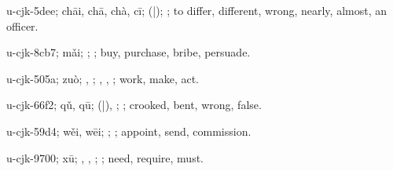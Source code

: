 \begin{multicols}{2}
{\cjkgGlue{}u-cjk-5dee; chāi, chā, chà, cī; \cjkgGlue{}\cjkgGlue{}(\cjkgGlue{}|\cjkgGlue{}); \cjkgGlue{}; to differ, different, wrong, nearly, almost, an officer.

\cjkgGlue{}u-cjk-8cb7; mǎi; \cjkgGlue{}\cjkgGlue{}\cjkgGlue{}; \cjkgGlue{}; buy, purchase, bribe, persuade.

\cjkgGlue{}u-cjk-505a; zuò; \cjkgGlue{}\cjkgGlue{}\cjkgGlue{}, \cjkgGlue{}\cjkgGlue{}\cjkgGlue{}; \cjkgGlue{}, \cjkgGlue{}, \cjkgGlue{}; work, make, act.

\cjkgGlue{}u-cjk-66f2; qǔ, qū; \cjkgGlue{}\cjkgGlue{}(\cjkgGlue{}|\cjkgGlue{}), \cjkgGlue{}; \cjkgGlue{}; crooked, bent, wrong, false.

\cjkgGlue{}u-cjk-59d4; wěi, wēi; \cjkgGlue{}\cjkgGlue{}\cjkgGlue{}; \cjkgGlue{}; appoint, send, commission.

\cjkgGlue{}u-cjk-9700; xū; \cjkgGlue{}, \cjkgGlue{}, \cjkgGlue{}; \cjkgGlue{}; need, require, must.

}
\end{multicols}
